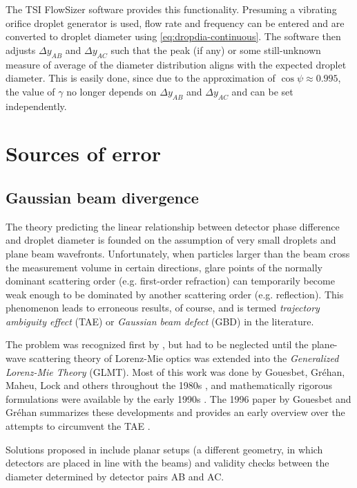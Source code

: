 \documentclass[11.5pt,oneside]{book}
\begin{document}
The TSI FlowSizer software provides this functionality. Presuming a vibrating
orifice droplet generator is used, flow rate and frequency can be entered and
are converted to droplet diameter using \eqref{eq:dropdia-continuous}. The
software then adjusts $\Delta y_{AB}$ and $\Delta y_{AC}$ such that the peak (if
any) or some still-unknown measure of average of the diameter distribution
aligns with the expected droplet diameter. This is easily done, since due to the
approximation of $\cos \psi \approx 0.995$, the value of $\gamma$ no longer
depends on $\Delta y_{AB}$ and $\Delta y_{AC}$ and can be set independently.


\section{Sources of error}
\subsection{Gaussian beam divergence}
The theory predicting the linear relationship between detector phase difference
and droplet diameter is founded on the assumption of very small droplets and
plane beam wavefronts. Unfortunately, when particles larger than the beam cross
the measurement volume in certain directions, glare points of the normally
dominant scattering order (e.g. first-order refraction) can temporarily become
weak enough to be dominated by another scattering order (e.g. reflection). This
phenomenon leads to erroneous results, of course, and is termed \emph{trajectory
ambiguity effect} (TAE) or \emph{Gaussian beam defect} (GBD) in the literature.

The problem was recognized first by \citet{Saffman86}, but had to be neglected until
the plane-wave scattering theory of Lorenz-Mie optics was extended into
the \emph{Generalized Lorenz-Mie Theory} (GLMT). Most of this work was
done by Gouesbet, Gréhan, Maheu, Lock and others throughout the 1980s
\cite{Grehan80, Gouesbet82, Gouesbet88, Maheu88}, and mathematically
rigorous formulations were available by the early 1990s \cite{Lock94,
Gouesbet94}. The 1996 paper by Gouesbet and Gréhan summarizes these developments
and provides an early overview over the attempts to circumvent the TAE
\cite{Gouesbet96}. 

Solutions proposed in \citet{Albrecht03} include planar setups (a different
geometry, in which detectors are placed in line with the beams) and validity
checks between the diameter determined by detector pairs AB and AC.
\end{document}
